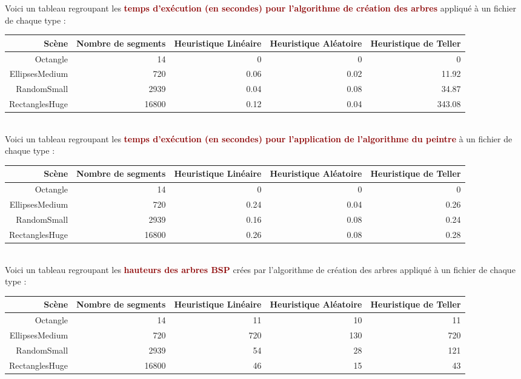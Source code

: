 \documentclass{article}
\newcommand{\dred}[1]{\textcolor{darkred}{\textbf{#1}}}
\begin{document}
\noindent Voici un tableau regroupant les \dred{temps d'exécution (en secondes) pour l'algorithme de création des arbres} appliqué à un fichier de chaque type :
\begin{center}
	\begin{tabular}{|*{5}{r|}}
	\hline
	Scène & Nombre de segments & Heuristique Linéaire & Heuristique Aléatoire & Heuristique de Teller \\
	\hline
	Octangle & 14 & 0 & 0 & 0 \\
	\hline
	EllipsesMedium & 720 & 0.06 & 0.02 & 11.92 \\
	\hline
	RandomSmall & 2939 & 0.04 & 0.08 & 34.87 \\
	\hline
	RectanglesHuge & 16800 & 0.12 & 0.04 & 343.08 \\
	\hline
	\end{tabular}
\end{center}
$ $ \\
Voici un tableau regroupant les \dred{temps d'exécution (en secondes) pour l'application de l'algorithme du peintre} à un fichier de chaque type :
\begin{center}
	\begin{tabular}{|*{5}{r|}}
	\hline
	Scène & Nombre de segments & Heuristique Linéaire & Heuristique Aléatoire & Heuristique de Teller \\
	\hline
	Octangle & 14 & 0 & 0 & 0 \\
	\hline
	EllipsesMedium & 720 & 0.24 & 0.04 & 0.26 \\
	\hline
	RandomSmall & 2939 & 0.16 & 0.08 & 0.24 \\
	\hline
	RectanglesHuge & 16800 & 0.26 & 0.08 & 0.28 \\
	\hline
	\end{tabular}
\end{center}
$ $ \\
Voici un tableau regroupant les \dred{hauteurs des arbres BSP} crées par l'algorithme de création des arbres appliqué à un fichier de chaque type : 
\begin{center}
	\begin{tabular}{|*{5}{r|}}
	\hline
	Scène & Nombre de segments & Heuristique Linéaire & Heuristique Aléatoire & Heuristique de Teller \\
	\hline
	Octangle & 14 & 11 & 10 & 11 \\
	\hline
	EllipsesMedium & 720 & 720 & 130 & 720 \\
	\hline
	RandomSmall & 2939 & 54 & 28 & 121 \\
	\hline
	RectanglesHuge & 16800 & 46 & 15 & 43\\
	\hline
	\end{tabular}
\end{center}
\end{document}
